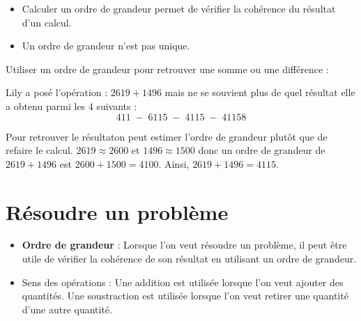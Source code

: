 \begin{pageCours}
\begin{Rqs}
\begin{itemize}
\item Calculer un ordre de grandeur permet de vérifier la cohérence du résultat d'un calcul.
\item Un ordre de grandeur n'est pas unique.
\end{itemize}
\end{Rqs}

\begin{Mt}
Utiliser un ordre de grandeur pour retrouver une somme ou une différence :

Lily a posé l'opération : $2619+1496$ mais ne se souvient plus de quel résultat elle a obtenu parmi les 4 suivants :
\[411\;-\;6115\;-\;4115\;-\;41158\]

Pour retrouver le résultaton peut estimer l'ordre de grandeur plutôt que de refaire le calcul. $2619\approx2600$ et $1496\approx1500$ donc un ordre de grandeur de $2619+1496$ est $2600+1500=4100$. Ainsi, $2619+1496=4115$.
\end{Mt}

\section{Résoudre un problème}

\begin{Mt}
\begin{itemize}
\item \textbf{Ordre de grandeur} : Lorsque l'on veut résoudre un problème, il peut être utile de vérifier la cohérence de son résultat en utilisant un ordre de grandeur.
\item Sens des opérations : Une addition est utilisée lorsque l'on veut ajouter des quantités. Une soustraction est utilisée lorsque l'on veut retirer une quantité d'une autre quantité.
\end{itemize}
\end{Mt}




\end{pageCours}
